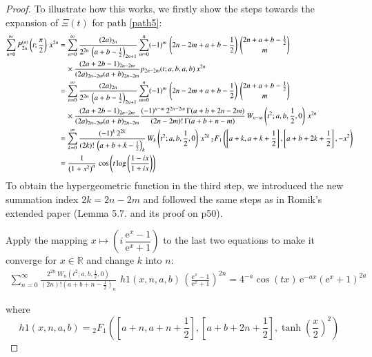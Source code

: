 \documentclass[a4paper,11pt,twoside]{amsart}
\newcommand{\verifiedeq}{=}
\newcommand{\defeq}{=}
\newcommand{\verifiedeq}{\stackrel{\checkmark}{=}}
\newcommand{\defeq}{\stackrel{\scriptscriptstyle \textnormal{def}}{=}}
\begin{document}
\begin{proof}
To illustrate how this works, we firstly show the steps towards the expansion of $\Xi(t)$ for path \ref{path5}: 
\begin{align}
\sum_{n=0}^\infty P_{2n}^{(a)}\left(t;\frac{\pi}{2}\right)\,x^{2n} &\defeq\sum_{n=0}^\infty \frac{(2a)_{2n}}{2^{2n}\,\left(a+b-\frac12\right)_{2n+1}} \sum_{m=0}^n (-1)^m\,\left(2n-2m+a+b-\frac12\right)\,\binom{2n+a+b-\frac12}{m}\, \notag \\ &\quad\times \frac{(2a+2b-1)_{2n-2m}}{(2a)_{2n-2m}(a+b)_{2n-2m}} p_{2n-2m}(t;a,b,a,b)\,x^{2n} \notag \\
 &\defeq\sum_{n=0}^\infty \frac{(2a)_{2n}}{2^{2n}\,\left(a+b-\frac12\right)_{2n+1}} \sum_{m=0}^n (-1)^m\,\left(2n-2m+a+b-\frac12\right)\,\binom{2n+a+b-\frac12}{m}\,  \notag\\ &\quad\times \frac{(2a+2b-1)_{2n-2m}}{(2a)_{2n-2m}(a+b)_{2n-2m}} \frac{(-1)^{n-m}\,2^{2n-2m}\,\Gamma(a+b+2n-2m)}{(2n-2m)!\,\Gamma(a+b+n-m)}\,W_{n-m}\left(t^2;a,b,\frac12,0\right)\,x^{2n}\notag\\
 &\defeq\sum_{k=0}^\infty \frac{(-1)^k\,2^{2k}}{(2k)!\,\left(a+b+k-\frac12\right)_{k}}\,W_k\left(t^2;a,b,\frac12,0\right)\,x^{2k}\,{}_2F_1\left(\left[a+k, a+k+\frac12\right],\left[a+b+2k+\frac12\right],-x^2\right) \\
 &\defeq \frac{1}{\left(1+x^2\right)^a}\, \cos\left(t\log\left(\frac{1-ix}{1+ix}\right)\right)
\end{align}
To obtain the hypergeometric function in the third step, we introduced the new summation index $2k = 2n-2m$ and followed the same steps as in Romik's extended paper (Lemma 5.7. and its proof on p50). 

Apply the mapping $x \mapsto \left(i\,\dfrac{\textrm{e}^{x}-1}{\textrm{e}^{x}+1}\right)$ to the last two equations to make it converge for $x \in \mathbb{R}$ and change $k$ into $n$:
\begin{align}
\sum_{n=0}^\infty \frac{2^{2n}\,W_n\left(t^2;a,b,\frac12,0\right)}{(2n)!\left(a+b+n-\frac12\right)_n}\, \,h1(x,n,a,b)\,\left(\frac{\textrm{e}^{x}-1}{\textrm{e}^{x}+1}\right)^{2n} \verifiedeq 4^{-a}\cos(tx)\,\mathrm{e}^{-ax}\left(\mathrm{e}^x+1\right)^{2a} 
\end{align}

where $$h1(x,n,a,b) \defeq {}_2F_1\left(\left[a+n, a+n+\frac12\right],\left[a+b+2n+\frac12\right],\tanh\left(\frac{x}{2}\right)^2\right)$$


\end{proof}
\end{document}
